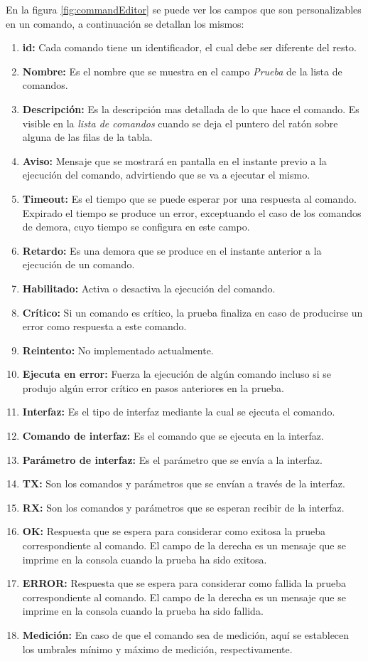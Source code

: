 \documentclass[a4paper,12pt]{refart}
\begin{document}
En la figura \ref{fig:commandEditor} se puede ver los campos que son personalizables en un comando, a continuación se detallan los mismos:

\begin{enumerate}
\item \textbf{id:} Cada comando tiene un identificador, el cual debe ser diferente del resto.
\item \textbf{Nombre:} Es el nombre que se muestra en el campo \textit{Prueba} de la lista de comandos.
\item \textbf{Descripción:} Es la descripción mas detallada de lo que hace el comando. Es visible en la \textit{lista de comandos} cuando se deja el puntero del ratón sobre alguna de las filas de la tabla.
\item \textbf{Aviso:} Mensaje que se mostrará en pantalla en el instante previo a la ejecución del comando, advirtiendo que se va a ejecutar el mismo.
\item \textbf{Timeout:} Es el tiempo que se puede esperar por una respuesta al comando. Expirado el tiempo se produce un error, exceptuando el caso de los comandos de demora, cuyo tiempo se configura en este campo.
\item \textbf{Retardo:} Es una demora que se produce en el instante anterior a la ejecución de un comando.
\item \textbf{Habilitado:} Activa o desactiva la ejecución del comando.
\item \textbf{Crítico:} Si un comando es crítico, la prueba finaliza en caso de producirse un error como respuesta a este comando.
\item \textbf{Reintento:} No implementado actualmente.
\item \textbf{Ejecuta en error:} Fuerza la ejecución de algún comando incluso si se produjo algún error crítico en pasos anteriores en la prueba.
\item \textbf{Interfaz:} Es el tipo de interfaz mediante la cual se ejecuta el comando.
\item \textbf{Comando de interfaz:} Es el comando que se ejecuta en la interfaz.
\item \textbf{Parámetro de interfaz:} Es el parámetro que se envía a la interfaz.
\item \textbf{TX:} Son los comandos y parámetros que se envían a través de la interfaz.
\item \textbf{RX:} Son los comandos y parámetros que se esperan recibir de la interfaz.
\item \textbf{OK:} Respuesta que se espera para considerar como exitosa la prueba correspondiente al comando. El campo de la derecha es un mensaje que se imprime en la consola cuando la prueba ha sido exitosa.
\item \textbf{ERROR:} Respuesta que se espera para considerar como fallida la prueba correspondiente al comando. El campo de la derecha es un mensaje que se imprime en la consola cuando la prueba ha sido fallida.
\item \textbf{Medición:} En caso de que el comando sea de medición, aquí se establecen los umbrales mínimo y máximo de medición, respectivamente.
\end{enumerate}
\end{document}
